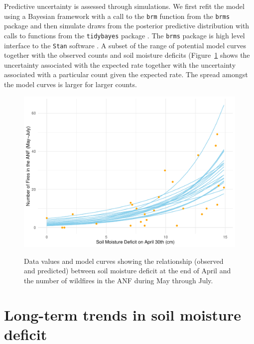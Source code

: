 \documentclass[12pt]{iopart}
\begin{document}
Predictive uncertainty is assessed through simulations. We first refit the model using a Bayesian framework with a call to the \texttt{brm} function from the \texttt{brms} package \citep{Burkner2021} and then simulate draws from the posterior predictive distribution with calls to functions from the \texttt{tidybayes} package \citep{Kay2022}. The \texttt{brms} package is high level interface to the \texttt{Stan} software \citep{CarpenterEtAl2017}.  A subset of the range of potential model curves together with the observed counts and soil moisture deficits (Figure~\ref{ModelPredictions} shows the uncertainty associated with the expected rate together with the uncertainty associated with a particular count given the expected rate. The spread amongst the model curves is larger for larger counts.
\begin{figure}[t]
\noindent\includegraphics[scale=.8,trim=0in 0in 0in 0in,clip]{ModelPredictions.pdf}\\
\vspace{0in}
\caption{Data values and model curves showing the relationship (observed and predicted) between soil moisture deficit at the end of April and the number of wildfires in the ANF during May through July.}
\label{ModelPredictions}
\end{figure}

\section{Long-term trends in soil moisture deficit}
\end{document}
